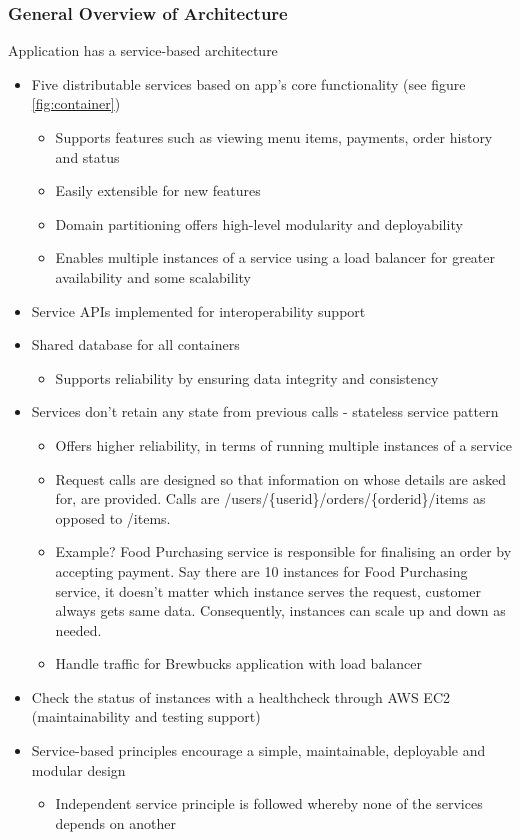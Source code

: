 \documentclass{article}
\begin{document}
\subsubsection*{General Overview of Architecture}
\medskip \noindent Application has a service-based architecture
\begin{itemize}
    \item Five distributable services based on app's core functionality (see figure \ref{fig:container})
    \begin{itemize}
     \item Supports features such as viewing menu items, payments, order history and status
     \item Easily extensible for new features
     \item Domain partitioning offers high-level modularity and deployability
     \item Enables multiple instances of a service using a load balancer for greater availability and some scalability
   \end{itemize}
   \item Service APIs implemented for interoperability support
   \item Shared database for all containers 
    \begin{itemize}
     \item Supports reliability by ensuring data integrity and consistency
    \end{itemize}
   \item Services don't retain any state from previous calls - stateless service pattern
    \begin{itemize}
    \item Offers higher reliability, in terms of running multiple instances of a service
    \item  Request calls are designed so that information on whose details are asked for, are provided. Calls are /users/\{userid\}/orders/\{orderid\}/items as opposed to /items.
     \item Example? Food Purchasing service is responsible for finalising an order by accepting payment. Say there are 10 instances for Food Purchasing service, it doesn't matter which instance serves the request, customer always gets same data. Consequently, instances can scale up and down as needed.
     \item Handle traffic for Brewbucks application with load balancer
    \end{itemize}
    \item Check the status of instances with a healthcheck through AWS EC2 (maintainability and testing support)
    \item Service-based principles encourage a simple, maintainable, deployable and modular design
    \begin{itemize}
     \item Independent service principle is followed whereby none of the services depends on another
    \end{itemize}
\end{itemize}
\end{document}

